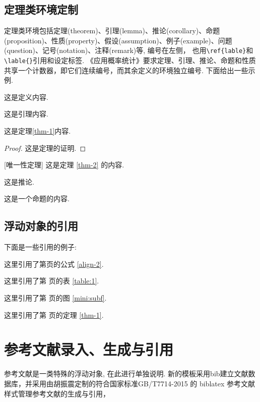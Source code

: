 \documentclass[Chinese]{APSart}
\begin{document}
\subsection{定理类环境定制}
定理类环境包括定理(theorem)、引理(lemma)、推论(corollary)、命题(proposition)、性质(property)、假设(assumption)、例子(example)、问题(question)、记号(notation)、注释(remark)等, 编号在左侧， 也用\verb|\ref{lable}|和\verb|\lable{}|引用和设定标签. 《应用概率统计》要求定理、引理、推论、命题和性质共享一个计数器，即它们连续编号，而其余定义的环境独立编号. 
下面给出一些示例.  
\begin{definition} %
	这是定义内容.
\end{definition}%
\begin{lemma}%
	这是引理内容.
\end{lemma}
\begin{theorem}\label{thm-1}%
	这是定理\ref{thm-1}内容.
\end{theorem}%
\begin{proof}%
	这是定理的证明.
\end{proof}
\begin{theorem}\label{thm-2}{[唯一性定理]}\;
	这是定理 \ref{thm-2} 的内容.
\end{theorem}%
\begin{corollary}%
	这是推论.
\end{corollary}
\begin{proposition}
	这是一个命题的内容.
\end{proposition}
\subsection{浮动对象的引用}
下面是一些引用的例子:
\begin{example}
	这里引用了第\pageref{align-2}页的公式 \eqref{align-2}.
\end{example}
\begin{example}
	这里引用了第 \pageref{table:1} 页的表 \ref{table:1}.
\end{example}
\begin{example}
	这里引用了第 \pageref{mini:subd} 页的图 \ref{mini:subf}.
\end{example}
\begin{example}
	这里引用了第 \pageref{thm-1} 页的定理 \ref{thm-1}.
\end{example}


\section{参考文献录入、生成与引用}\label{bib-ref}
参考文献是一类特殊的浮动对象, 在此进行单独说明. 
新的模板采用bib建立文献数据库，并采用由胡振震定制的符合国家标准GB/T7714-2015 的 biblatex 参考文献样式管理参考文献的生成与引用，
\end{document}
